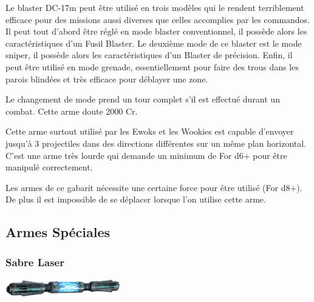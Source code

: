 \begin{description}[align=left]
    \item [Fusil Blaster DC-17m]
        Le blaster DC-17m peut être utilisé en trois modèles qui le rendent terriblement efficace pour des missions aussi diverses que celles accomplies par les commandos. Il peut tout d’abord être réglé en mode blaster conventionnel, il possède alors les caractéristiques d’un Fusil Blaster. Le deuxième mode de ce blaster est le mode sniper, il possède alors les caractéristiques d’un Blaster de précision. Enfin, il peut être utilisé en mode grenade, essentiellement pour faire des trous dans les parois blindées et très efficace pour déblayer une zone.

        Le changement de mode prend un tour complet s’il est effectué durant un combat. Cette arme doute 2000 Cr.

    \item [Arbalète Laser]
        Cette arme surtout utilisé par les Ewoks et les Wookies est capable d’envoyer jusqu’à 3 projectiles dans des directions différentes sur un même plan horizontal. C’est une arme très lourde qui demande un minimum de For d6+ pour être manipulé correctement.

    \item [Canon blaster rotatif]
        Les armes de ce gabarit nécessite une certaine force pour être utilisé (For d8+). De plus il est impossible de se déplacer lorsque l’on utilise cette arme.
\end{description}

\clearpage
\subsection{Armes Spéciales}

\subsubsection{Sabre Laser}
\label{sec:sabre-laser}

\begin{flushright}
	\vspace{-5\baselineskip}
	\includegraphics[width=5cm, angle=-25]{img/equipement/lightsaber01.png}
	\vspace{-1\baselineskip}
\end{flushright}

